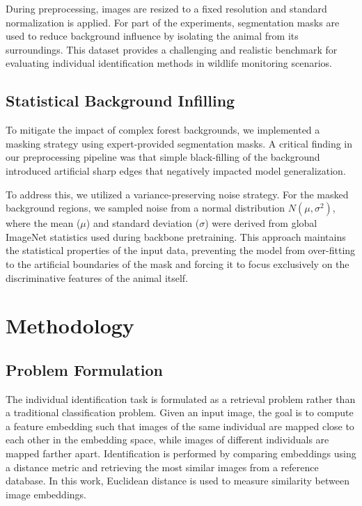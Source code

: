 \documentclass{article}
\begin{document}
During preprocessing, images are resized to a fixed resolution and standard normalization is applied. For part of the experiments, segmentation masks are used to reduce background influence by isolating the animal from its surroundings. This dataset provides a challenging and realistic benchmark for evaluating individual identification methods in wildlife monitoring scenarios.

\subsection{Statistical Background Infilling}

To mitigate the impact of complex forest backgrounds, we implemented a masking strategy using expert-provided segmentation masks. A critical finding in our preprocessing pipeline was that simple black-filling of the background introduced artificial sharp edges that negatively impacted model generalization. 

To address this, we utilized a variance-preserving noise strategy. For the masked background regions, we sampled noise from a normal distribution $N(\mu, \sigma^2)$, where the mean ($\mu$) and standard deviation ($\sigma$) were derived from global ImageNet statistics used during backbone pretraining. This approach maintains the statistical properties of the input data, preventing the model from over-fitting to the artificial boundaries of the mask and forcing it to focus exclusively on the discriminative features of the animal itself.

\section{Methodology}

\subsection{Problem Formulation}
The individual identification task is formulated as a retrieval problem rather than a traditional classification problem. Given an input image, the goal is to compute a feature embedding such that images of the same individual are mapped close to each other in the embedding space, while images of different individuals are mapped farther apart. Identification is performed by comparing embeddings using a distance metric and retrieving the most similar images from a reference database. In this work, Euclidean distance is used to measure similarity between image embeddings.
\end{document}
